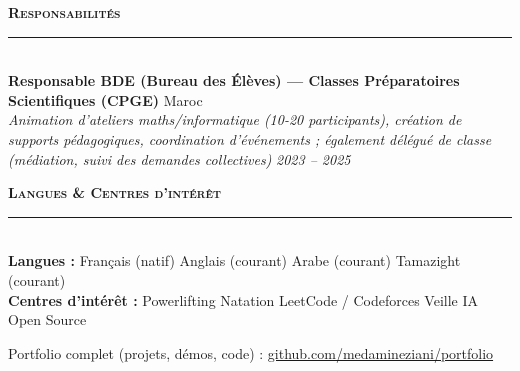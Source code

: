 \documentclass[11pt,a4paper]{article}
\newcommand{\cvsection}[1]{%
  \vspace{7pt}
  {\color{accent}\large\bfseries\scshape #1}\\[1pt]
  {\color{accent}\rule{\linewidth}{0.9pt}}\\[3pt]
}
\newcommand{\cventry}[4]{%
  \noindent\textbf{#1} \hfill {\color{graytext}\small #4}\\
  {\color{accent}\itshape #3} \hfill {\itshape\small #2}\\[2pt]
}
\begin{document}
\cvsection{Responsabilités}
\small
\cventry{Responsable BDE (Bureau des Élèves) — Classes Préparatoires Scientifiques (CPGE)}{2023 -- 2025}{Animation d'ateliers maths/informatique (10-20 participants), création de supports pédagogiques, coordination d'événements ; également délégué de classe (médiation, suivi des demandes collectives)}{Maroc}
\normalsize

\cvsection{Langues \& Centres d'intérêt}
\small
\textbf{Langues :} Français (natif) \textbullet{} Anglais (courant) \textbullet{} Arabe (courant) \textbullet{} Tamazight (courant)\\[2pt]
\textbf{Centres d'intérêt :} Powerlifting \textbullet{} Natation \textbullet{} LeetCode / Codeforces \textbullet{} Veille IA \textbullet{} Open Source
\normalsize

\vfill
\begin{center}
  {\small\color{graytext} Portfolio complet (projets, démos, code) :
  \href{https://github.com/medamineziani/portfolio}{\color{accent}github.com/medamineziani/portfolio}}
\end{center}
\end{document}
